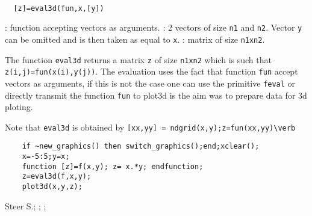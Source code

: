\begin{mandesc}
  \\
\end{mandesc}
\begin{calling_sequence}
\begin{verbatim}
  [z]=eval3d(fun,x,[y])
\end{verbatim}
\end{calling_sequence}
\begin{parameters}
  \begin{varlist}
    : function accepting vectors as arguments.
    : 2 vectors of size \verb!n1! and \verb!n2!. Vector \verb!y! can be omitted and
    is then taken as equal to \verb!x!.
    : matrix of size \verb!n1xn2!.
  \end{varlist}
\end{parameters}
\begin{mandescription}
  The function \verb!eval3d! returns a matrix \verb!z! of size \verb!n1xn2!
  which is such that \verb!z(i,j)=fun(x(i),y(j))!. The evaluation uses
  the fact that function \verb!fun! accept vectors as arguments, if this is not
  the case one can use the primitive \verb!feval! or directly transmit the function
  \verb!fun! to plot3d is the aim was to prepare data for 3d ploting.

  Note that \verb!eval3d! is obtained by \verb![xx,yy] = ndgrid(x,y);z=fun(xx,yy)\verb!
\end{mandescription}

\begin{examples}
  \begin{Verbatim}
    if ~new_graphics() then switch_graphics();end;xclear();
    x=-5:5;y=x;
    function [z]=f(x,y); z= x.*y; endfunction;
    z=eval3d(f,x,y);
    plot3d(x,y,z);
  \end{Verbatim}
\end{examples}

\begin{manseealso}
\end{manseealso}


\begin{authors}
  Steer S.; ; ;

\end{authors}
